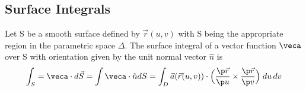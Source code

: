 \documentclass[a4paper, 11pt, normalem]{report}
\begin{document}
\chapter{}
\section{Surface Integrals}
Let S be a smooth surface defined by $\vec{r}(u, v)$ with S being the appropriate region in the parametric space $\Delta$.
The surface integral of a vector function $\veca$ over S with orientation given by the unit normal vector $\hat{n}$ is
\begin{equation*}
    \int_S = \veca \cdot d\vec{S} = \int \veca \cdot \hat{n}dS = \int_D \vec{a}(\vec{r}(u, v)) \cdot \Big(\frac{\p \vec{r}}{\p u} \times \frac{\p \vec{r}}{\p v}\Big)\;du\,dv
\end{equation*}
\end{document}

